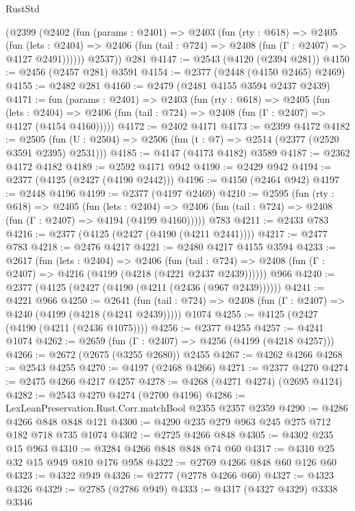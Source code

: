 \begin{lexlean}{RustStd}
\begin{coremodule}
      (@2399
        (@2402
          (fun (params : @2401) =>
          @2403
            (fun (rty : @618) =>
            @2405
              (fun (lets : @2404) =>
              @2406 (fun (tail : @724) => @2408 (fun (Γ : @2407) => @4127 @2491))))))
        @2537))
    @281
@4147 := @2543 (@4120 (@2394 @281))
@4150 := @2456 (@2457 @281) @3591
@4154 := @2377 (@2448 (@4150 @2465) @2469)
@4155 := @2482 @281
@4160 := @2479 (@2481 @4155 @3594 @2437 @2439)
@4171 := fun (params : @2401) =>
  @2403
    (fun (rty : @618) =>
    @2405
      (fun (lets : @2404) =>
      @2406 (fun (tail : @724) => @2408 (fun (Γ : @2407) => @4127 (@4154 @4160)))))
@4172 := @2402 @4171
@4173 := @2399 @4172
@4182 := @2505 (fun (U : @2504) => @2506 (fun (t : @7) => @2514 (@2377 (@2520 @3591 @2395) @2531)))
@4185 := @4147 (@4173 @4182) @3589
@4187 := @2362 @4172 @4182
@4189 := @2592 @4171 @942
@4190 := @2429 @942
@4194 := @2377 (@4125 (@2427 (@4190 @2442)))
@4196 := @4150 (@2464 @942)
@4197 := @2448 @4196
@4199 := @2377 (@4197 @2469)
@4210 := @2595
    (fun (rty : @618) =>
    @2405
      (fun (lets : @2404) =>
      @2406 (fun (tail : @724) => @2408 (fun (Γ : @2407) => @4194 (@4199 @4160)))))
    @783
@4211 := @2433 @783
@4216 := @2377 (@4125 (@2427 (@4190 (@4211 @2441))))
@4217 := @2477 @783
@4218 := @2476 @4217
@4221 := @2480 @4217 @4155 @3594
@4233 := @2617
    (fun (lets : @2404) =>
    @2406
      (fun (tail : @724) => @2408 (fun (Γ : @2407) => @4216 (@4199 (@4218 (@4221 @2437 @2439))))))
    @966
@4240 := @2377 (@4125 (@2427 (@4190 (@4211 (@2436 (@967 @2439))))))
@4241 := @4221 @966
@4250 := @2641
    (fun (tail : @724) => @2408 (fun (Γ : @2407) => @4240 (@4199 (@4218 (@4241 @2439)))))
    @1074
@4255 := @4125 (@2427 (@4190 (@4211 (@2436 @1075))))
@4256 := @2377 @4255
@4257 := @4241 @1074
@4262 := @2659 (fun (Γ : @2407) => @4256 (@4199 (@4218 @4257)))
@4266 := @2672 (@2675 (@3255 @2680)) @2455
@4267 := @4262 @4266
@4268 := @2543 @4255
@4270 := @4197 (@2468 @4266)
@4271 := @2377 @4270
@4274 := @2475 @4266 @4217 @4257
@4278 := @4268 (@4271 @4274) (@2695 @4124)
@4282 := @2543 @4270 @4274 (@2700 @4196)
@4286 := LexLeanPreservation.Rust.Corr.matchBool @2355 @2357 @2359
@4290 := @4286 @4266 @848 @848 @121
@4300 := @4290 @235 @279 @963 @245 @275 @712 @182 @718 @735 @1074
@4302 := @2725 @4266 @848
@4305 := @4302 @235 @15 @963
@4310 := @3284 @4266 @848 @848 @74 @60
@4317 := @4310 @25 @32 @15 @949 @810 @176 @958
@4322 := @2769 @4266 @848 @60 @126 @60
@4323 := @4322 @949
@4326 := @2777 (@2778 @4266 @60)
@4327 := @4323 @4326
@4329 := @2785 (@2786 @949)
@4333 := @4317 (@4327 @4329) @3338 @3346

\end{coremodule}
\end{lexlean}
